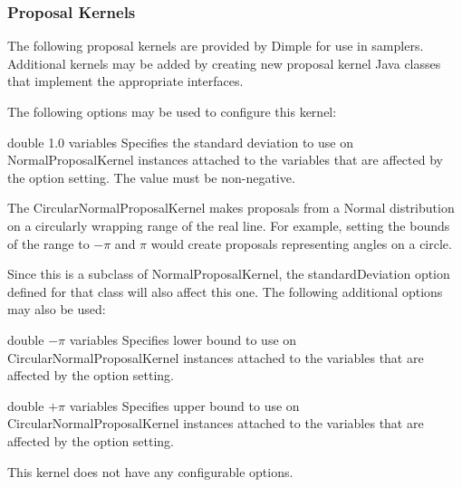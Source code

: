 \clearpage
\subsubsection{Proposal Kernels}
\label{sec:ProposalKernels}

The following proposal kernels are provided by Dimple for use in samplers. Additional kernels may be added by creating new proposal kernel Java classes that implement the appropriate interfaces.

\label{sec:NormalProposalKernel}

The following options may be used to configure this kernel:


{double}
{1.0}
{variables}
{Specifies the standard deviation to use on NormalProposalKernel instances attached to the variables that are affected by the option setting. The value must be non-negative.}

\label{sec:CircularNormalProposalKernel}

The CircularNormalProposalKernel makes proposals from a Normal distribution on a circularly wrapping range of the real line.  For example, setting the bounds of the range to $-\pi$ and $\pi$ would create proposals representing angles on a circle.

Since this is a subclass of NormalProposalKernel, the standardDeviation option defined for that class will also affect this one. The following additional options may also be used:


{double}
{$-\pi$}
{variables}
{Specifies lower bound to use on CircularNormalProposalKernel instances attached to the variables that are affected by the option setting.}


{double}
{$+\pi$}
{variables}
{Specifies upper bound to use on CircularNormalProposalKernel instances attached to the variables that are affected by the option setting.}

\label{sec:UniformDiscreteProposalKernel}

This kernel does not have any configurable options.

